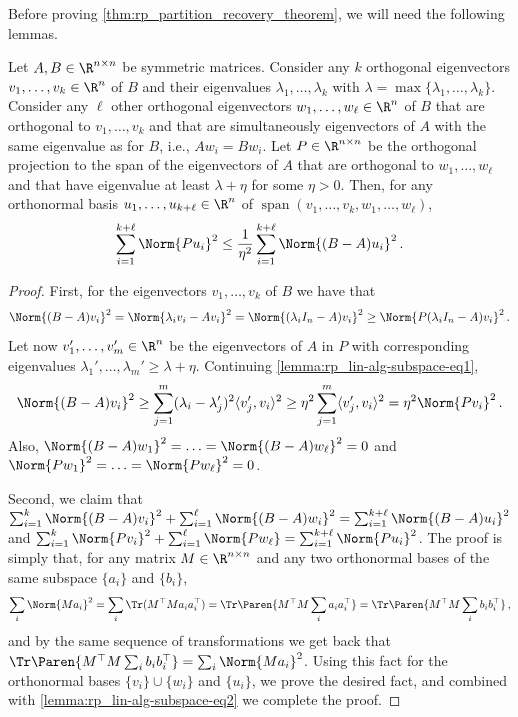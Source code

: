 Before proving \cref{thm:rp_partition_recovery_theorem}, we will need the following lemmas.

\begin{lemma}
\label{lemma:rp_lin-alg-subspace}
    Let $A, B \in \R^{n \times n}$ be symmetric matrices.
    Consider any $k$ orthogonal eigenvectors $v_1, \ldots, v_{k} \in \R^n$ of $B$ and their eigenvalues $\lambda_1, \ldots, \lambda_{k}$ with $\lambda = \max\{\lambda_1, \ldots, \lambda_k\}$.
    Consider any $\ell$ other orthogonal eigenvectors $w_1, \ldots, w_\ell \in \R^n$ of $B$ that are orthogonal to $v_1, \ldots, v_k$ and that are simultaneously eigenvectors of $A$ with the same eigenvalue as for $B$, i.e., $A w_i = B w_i$.
    Let $P \in \R^{n \times n}$ be the orthogonal projection to the span of the eigenvectors of $A$ that are orthogonal to $w_1, \ldots, w_{\ell}$ and that have eigenvalue at least $\lambda + \eta$ for some $\eta > 0$.
    Then, for any orthonormal basis $u_1, \ldots, u_{k+\ell} \in \R^n$ of $\operatorname{span}(v_1, \ldots, v_k, w_1, \ldots, w_{\ell})$,
    \[\sum_{i=1}^{k+\ell} \Norm{P u_i}^2 \leq \frac{1}{\eta^2} \sum_{i=1}^{k+\ell} \Norm{(B-A)u_i}^2\,.\]
\end{lemma}

\begin{proof}
First, for the eigenvectors $v_1, \ldots, v_{k}$ of $B$ we have that 
\begin{equation}
\label{lemma:rp_lin-alg-subspace-eq1}
\Norm{(B-A)v_i}^2 = \Norm{\lambda_i v_i - A v_i}^2 = \Norm{(\lambda_i I_n - A) v_i}^2 \geq \Norm{P(\lambda_i I_n - A) v_i}^2\,.
\end{equation}
Let now $v_1', \ldots, v_{m}' \in \R^n$ be the eigenvectors of $A$ in $P$ with corresponding eigenvalues $\lambda_1', \ldots, \lambda_{m}' \geq \lambda + \eta$.
Continuing \cref{lemma:rp_lin-alg-subspace-eq1},
\begin{equation}
\label{lemma:rp_lin-alg-subspace-eq2}
\Norm{(B-A)v_i}^2 \geq \sum_{j=1}^{m} (\lambda_i - \lambda_j')^2 \langle v_j', v_i \rangle^2 \geq \eta^2 \sum_{j=1}^{m} \langle v_j', v_i \rangle^2 = \eta^2 \Norm{Pv_i}^2\,.
\end{equation}
Also, $\Norm{(B-A)w_1}^2 = \ldots = \Norm{(B-A)w_\ell}^2 = 0$ and $\Norm{Pw_1}^2 = \ldots = \Norm{Pw_\ell}^2 = 0$.

Second, we claim that $\sum_{i=1}^k \Norm{(B-A)v_i}^2 + \sum_{i=1}^{\ell} \Norm{(B-A)w_i}^2 = \sum_{i=1}^{k+\ell} \Norm{(B-A)u_i}^2$ and $\sum_{i=1}^k \Norm{P v_i}^2 + \sum_{i=1}^{\ell} \Norm{P w_{\ell}} = \sum_{i=1}^{k+\ell} \Norm{P u_i}^2$.
The proof is simply that, for any matrix $M \in \R^{n \times n}$ and any two orthonormal bases of the same subspace $\{a_i\}$ and $\{b_i\}$,
\[\sum_{i} \Norm{Ma_i}^2 = \sum_{i} \Tr(M^\top M a_i a_i^\top) = \Tr\Paren{M^\top M \sum_{i} a_i a_i^\top} = \Tr\Paren{M^\top M \sum_{i} b_i b_i^\top}\,,\]
and by the same sequence of transformations we get back that $\Tr\Paren{M^\top M \sum_{i} b_i b_i^\top} = \sum_{i} \Norm{Ma_i}^2$. 
Using this fact for the orthonormal bases $\{v_i\} \cup \{w_i\}$ and $\{u_i\}$, we prove the desired fact, and combined with \cref{lemma:rp_lin-alg-subspace-eq2} we complete the proof.
\end{proof}

